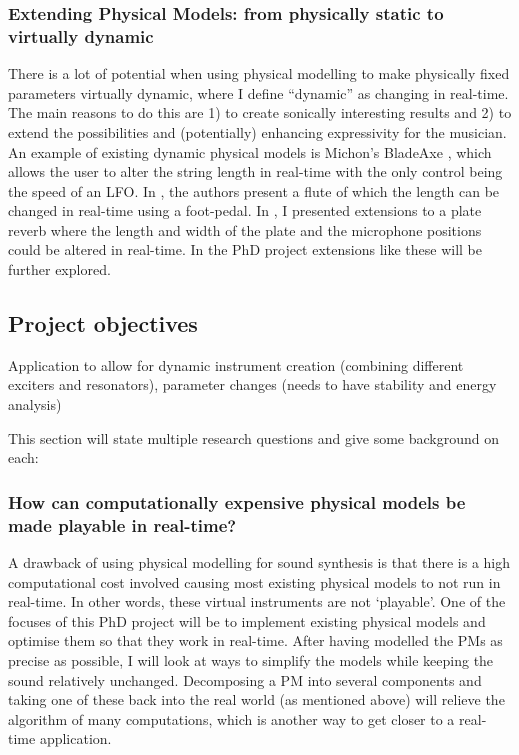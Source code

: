 \subsubsection*{Extending Physical Models: from physically static to virtually dynamic}
There is a lot of potential when using physical modelling to make physically fixed parameters virtually dynamic, where I define ``dynamic'' as changing in real-time. The main reasons to do this are 1) to create sonically interesting results and 2) to extend the possibilities and (potentially) enhancing expressivity for the musician.
An example of existing dynamic physical models is Michon’s BladeAxe \cite{Michon2016}, which allows the user to alter the string length in real-time with the only control being the speed of an LFO. In \cite{Gelineck2005}, the authors present a flute of which the length can be changed in real-time using a foot-pedal. In \cite{Willemsen2017}, I presented extensions to a plate reverb where the length and width of the plate and the microphone positions could be altered in real-time. In the PhD project extensions like these will be further explored.

\subsection{Project objectives}
Application to allow for dynamic instrument creation (combining different exciters and resonators), parameter changes (needs to have stability and energy analysis) 

This section will state multiple research questions and give some background on each:

\subsubsection*{How can computationally expensive physical models be made playable in real-time?}
A drawback of using physical modelling for sound synthesis is that there is a high computational cost involved causing most existing physical models to not run in real-time. In other words, these virtual instruments are not ‘playable’. One of the focuses of this PhD project will be to implement existing physical models and optimise them so that they work in real-time. 
After having modelled the PMs as precise as possible, I will look at ways to simplify the models while keeping the sound relatively unchanged. Decomposing a PM into several components and taking one of these back into the real world (as mentioned above) will relieve the algorithm of many computations, which is another way to get closer to a real-time application.

